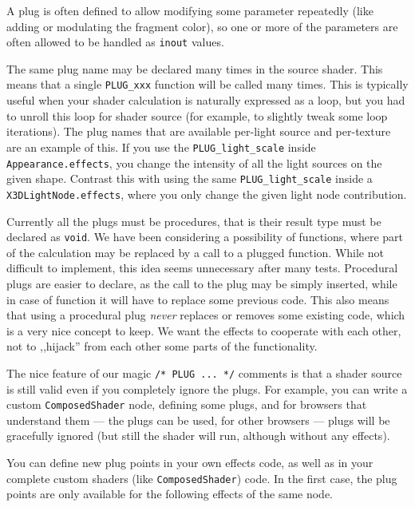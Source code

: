 \documentclass{acmsiggraph}                     %
\begin{document}
A plug is often defined to allow modifying some parameter
repeatedly (like adding or modulating the fragment color),
so one or more of the parameters are often allowed to be handled
as \texttt{inout} values.

The same plug name may be declared many times in the source shader.
This means that a single \texttt{PLUG\_xxx} function will be called
many times. This is typically useful when your shader calculation is naturally
expressed as a loop, but you had to unroll this loop for shader source
(for example, to slightly tweak some loop iterations).
The plug names that are available per-light source and per-texture
are an example of this.
If you use the \texttt{PLUG\_light\_scale}
inside \texttt{Appearance.effects}, you change the intensity
of all the light sources on the given shape. Contrast this with using
the same \texttt{PLUG\_light\_scale} inside a \texttt{X3DLightNode.effects},
where you only change the given light node contribution.

Currently all the plugs must be procedures, that is their result type
must be declared as \texttt{void}. We have been considering
a possibility of functions, where part of the calculation may be replaced
by a call to a plugged function. While not difficult to implement,
this idea seems unnecessary after many tests.
Procedural plugs are easier to declare, as the call to the plug
may be simply inserted, while in case of function it will have to replace
some previous code. This also means that using a procedural plug
\textit{never} replaces or removes some existing code, which is a very nice
concept to keep. We want the effects to cooperate with each other,
not to ,,hijack'' from each other some parts of the functionality.

The nice feature of our magic \texttt{/* PLUG ... */} comments is that a shader source
is still valid even if you completely ignore the plugs. For example,
you can write a custom \texttt{ComposedShader} node, defining some plugs,
and for browsers that understand them --- the plugs can be used,
for other browsers --- plugs will be gracefully ignored (but still
the shader will run, although without any effects).

You can define new plug points in your own effects code, as well as in your
complete custom shaders (like \texttt{ComposedShader}) code.
In the first case, the plug points
are only available for the following effects of the same node.
\end{document}
